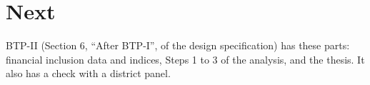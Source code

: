 \documentclass[11pt,a4paper]{article}
\begin{document}
\section{Next}
BTP-II (Section 6, ``After BTP-I'', of the design specification) has these parts: financial inclusion data and indices, Steps 1 to 3 of the analysis, and the thesis. It also has a check with a district panel.



\end{document}
